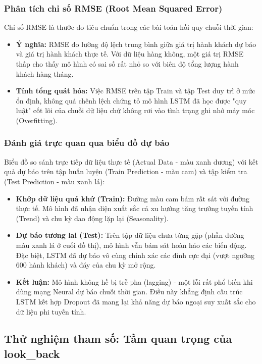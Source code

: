 \subsubsection{Phân tích chỉ số RMSE (Root Mean Squared Error)}
Chỉ số RMSE là thước đo tiêu chuẩn trong các bài toán hồi quy chuỗi thời gian:
\begin{itemize}
    \item \textbf{Ý nghĩa:} RMSE đo lường độ lệch trung bình giữa giá trị hành khách dự báo và giá trị hành khách thực tế. Với dữ liệu hàng không, một giá trị RMSE thấp cho thấy mô hình có sai số rất nhỏ so với biên độ tổng lượng hành khách hàng tháng.
    \item \textbf{Tính tổng quát hóa:} Việc RMSE trên tập Train và tập Test duy trì ở mức ổn định, không quá chênh lệch chứng tỏ mô hình LSTM đã học được "quy luật" cốt lõi của chuỗi dữ liệu chứ không rơi vào tình trạng ghi nhớ máy móc (Overfitting).
\end{itemize}

\subsubsection{Đánh giá trực quan qua biểu đồ dự báo}
Biểu đồ so sánh trực tiếp dữ liệu thực tế (Actual Data - màu xanh dương) với kết quả dự báo trên tập huấn luyện (Train Prediction - màu cam) và tập kiểm tra (Test Prediction - màu xanh lá):
\begin{itemize}
    \item \textbf{Khớp dữ liệu quá khứ (Train):} Đường màu cam bám rất sát với đường thực tế. Mô hình đã nhận diện xuất sắc cả xu hướng tăng trưởng tuyến tính (Trend) và chu kỳ dao động lặp lại (Seasonality).
    \item \textbf{Dự báo tương lai (Test):} Trên tập dữ liệu chưa từng gặp (phần đường màu xanh lá ở cuối đồ thị), mô hình vẫn bám sát hoàn hảo các biến động. Đặc biệt, LSTM đã dự báo vô cùng chính xác các đỉnh cực đại (vượt ngưỡng 600 hành khách) và đáy của chu kỳ mở rộng.
    \item \textbf{Kết luận:} Mô hình không hề bị trễ pha (lagging) - một lỗi rất phổ biến khi dùng mạng Neural dự báo chuỗi thời gian. Điều này khẳng định cấu trúc LSTM kết hợp Dropout đã mang lại khả năng dự báo ngoại suy xuất sắc cho dữ liệu phi tuyến tính.
\end{itemize}

\subsection{Thử nghiệm tham số: Tầm quan trọng của look\_back}

